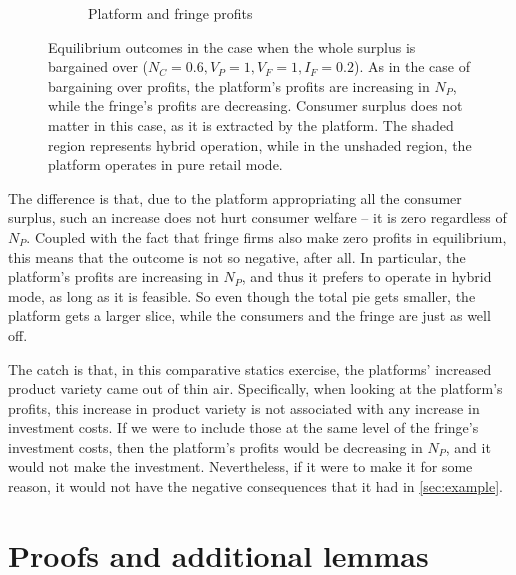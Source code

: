 \documentclass[a4paper]{article}
\begin{document}
\begin{figure}
\begin{subfigure}[b]{0.45\textwidth}
        \caption{Platform and fringe profits}
    \end{subfigure}
    \caption{Equilibrium outcomes in the case when the whole surplus is bargained over ($N_C = 0.6, V_P = 1, V_F = 1, I_F = 0.2$). As in the case of bargaining over profits, the platform's profits are increasing in $N_P$, while the fringe's profits are decreasing. Consumer surplus does not matter in this case, as it is extracted by the platform. The shaded region represents hybrid operation, while in the unshaded region, the platform operates in pure retail mode.}
    \label{fig:equilibrium_full_surplus_one_sided}
\end{figure}


The difference is that, due to the platform appropriating all the consumer surplus, such an increase does not hurt consumer welfare -- it is zero regardless of $N_P$.
Coupled with the fact that fringe firms also make zero profits in equilibrium, this means that the outcome is not so negative, after all.
In particular, the platform's profits are increasing in $N_P$, and thus it prefers to operate in hybrid mode, as long as it is feasible.
So even though the total pie gets smaller, the platform gets a larger slice, while the consumers and the fringe are just as well off.

The catch is that, in this comparative statics exercise, the platforms' increased product variety came out of thin air.
Specifically, when looking at the platform's profits, this increase in product variety is not associated with any increase in investment costs.
If we were to include those at the same level of the fringe's investment costs, then the platform's profits would be decreasing in $N_P$, and it would not make the investment.
Nevertheless, if it were to make it for some reason, it would not have the negative consequences that it had in \cref{sec:example}.


\section{Proofs and additional lemmas}
\end{document}
